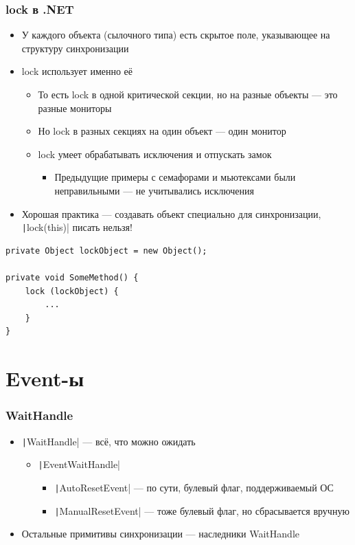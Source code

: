 \documentclass[xetex,mathserif,serif]{beamer}
\begin{document}
	\begin{frame}[fragile]
		\frametitle{lock в .NET}
		\begin{itemize}
			\item У каждого объекта (сылочного типа) есть скрытое поле, указывающее на структуру синхронизации
			\item lock использует именно её
			\begin{itemize}
				\item То есть lock в одной критической секции, но на разные объекты --- это разные мониторы
				\item Но lock в разных секциях на один объект --- один монитор
				\item lock умеет обрабатывать исключения и отпускать замок
				\begin{itemize}
					\item Предыдущие примеры с семафорами и мьютексами были неправильными --- не учитывались исключения
				\end{itemize}
			\end{itemize}
			\item Хорошая практика --- создавать объект специально для синхронизации, \texttt|lock(this)| писать нельзя!
		\end{itemize}
		\begin{footnotesize}
			\begin{verbatim}
private Object lockObject = new Object();

private void SomeMethod() {
    lock (lockObject) {
        ...
    }
}
			\end{verbatim}
		\end{footnotesize}
	\end{frame}

	\section{Event-ы}

	\begin{frame}
		\frametitle{WaitHandle}
		\begin{itemize}
			\item \texttt|WaitHandle| --- всё, что можно ожидать
			\begin{itemize}
				\item \texttt|EventWaitHandle|
				\begin{itemize}
					\item \texttt|AutoResetEvent| --- по сути, булевый флаг, поддерживаемый ОС
					\item \texttt|ManualResetEvent| --- тоже булевый флаг, но сбрасывается вручную
				\end{itemize}
			\end{itemize}
			\item Остальные примитивы синхронизации --- наследники WaitHandle
		\end{itemize}
	\end{frame}
\end{document}
